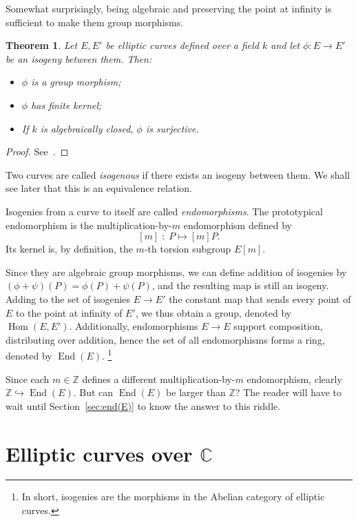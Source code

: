 \documentclass[10pt]{article}
\theoremstyle{plain}
\newtheorem{theorem}{Theorem}
\theoremstyle{definition}
\DeclareMathOperator{\End}{End} %
\DeclareMathOperator{\Hom}{Hom} %
\begin{document}
Somewhat surprisingly, being algebraic and preserving the point at
infinity is sufficient to make them group morphisms.

\begin{theorem}
  Let $E,E'$ be elliptic curves defined over a field $k$ and let
  $\phi:E→E'$ be an isogeny between them. %
  Then:
  \begin{itemize}
  \item $\phi$ is a group morphism;
  \item $\phi$ has finite kernel;
  \item If $k$ is algebraically closed, $\phi$ is surjective.
  \end{itemize}
\end{theorem}
\begin{proof}
  See~\cite[III, Th.~4.8]{silverman:elliptic}.
\end{proof}

Two curves are called \emph{isogenous} if there exists an isogeny
between them. %
We shall see later that this is an equivalence relation.

Isogenies from a curve to itself are called \emph{endomorphisms}. %
The prototypical endomorphism is the multiplication-by-$m$
endomorphism defined by
\[[m]\;:\; P \mapsto [m]P.\] %
Its kernel is, by definition, the $m$-th torsion subgroup $E[m]$. %

Since they are algebraic group morphisms, we can define addition of
isogenies by $(ϕ+ψ)(P) = ϕ(P)+ψ(P)$, and the resulting map is still an
isogeny. %
Adding to the set of isogenies $E\to E'$ the constant map that sends
every point of $E$ to the point at infinity of $E'$, we thus obtain a
group, denoted by $\Hom(E,E')$. %
Additionally, endomorphisms $E\to E$ support composition, distributing
over addition, hence the set of all endomorphisms forms a ring,
denoted by $\End(E)$.%
\footnote{In short, isogenies are the morphisms in the Abelian
  category of elliptic curves.}

Since each $m∈ℤ$ defines a different multiplication-by-$m$
endomorphism, clearly $ℤ \hookrightarrow \End(E)$. %
But can $\End(E)$ be larger than $ℤ$? %
The reader will have to wait until Section~\ref{sec:end(E)} to know
the answer to this riddle.



\section{Elliptic curves over $ℂ$}
\label{sec:elliptic-curves-over}
\end{document}
